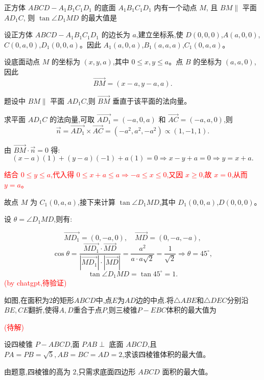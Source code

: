 \begin{questions}
    
    \question 正方体 $ABCD-A_1B_1C_1D_1$ 的底面 $A_1B_1C_1D_1$ 内有一个动点 $M$, 且 $BM \parallel$ 平面 $AD_1C$, 则 $\tan \angle D_1MD$ 的最大值是
    \begin{solution}
设正方体 $ABCD - A_1B_1C_1D_1$ 的边长为 $a$,建立坐标系,使 $D(0,0,0)$,$A(a,0,0)$,$C(0,a,0)$,$D_1(0,0,a)$。因此 $A_1(a,0,a)$,$B_1(a,a,a)$,$C_1(0,a,a)$。

设底面动点 $M$ 的坐标为 $(x,y,a)$,其中 $0 \le x,y \le a$。点 $B$ 的坐标为 $(a,a,0)$,因此
\[
\vec{BM} = (x - a, y - a, a).
\]

题设中 $BM \parallel$ 平面 $AD_1C$,则 $\vec{BM}$ 垂直于该平面的法向量。

求平面 $AD_1C$ 的法向量,可取 $\vec{AD_1} = (-a, 0, a)$ 和 $\vec{AC} = (-a, a, 0)$,则
\[
\vec{n} = \vec{AD_1} \times \vec{AC} = (-a^2, a^2, -a^2) \propto (1, -1, 1).
\]

由 $\vec{BM} \cdot \vec{n} = 0$ 得:
\[
(x - a)(1) + (y - a)(-1) + a(1) = 0 \Rightarrow x - y + a = 0 \Rightarrow y = x + a.
\]

\textcolor{red}{结合 $0 \le y \le a$,代入得 $0 \le x + a \le a \Rightarrow -a \le x \le 0$,又因 $x \ge 0$,故 $x = 0$,从而 $y = a$。}

故点 $M$ 为 $C_1(0,a,a)$,接下来计算 $\tan \angle D_1MD$,其中 $D_1(0,0,a)$,$D(0,0,0)$。

设 $\theta = \angle D_1MD$,则有:

\[
\vec{MD_1} = (0, -a, 0), \quad \vec{MD} = (0, -a, -a),
\]
\[
\cos \theta = \frac{\vec{MD_1} \cdot \vec{MD}}{|\vec{MD_1}| \cdot |\vec{MD}|} = \frac{a^2}{a \cdot a\sqrt{2}} = \frac{1}{\sqrt{2}} \Rightarrow \theta = 45^\circ,
\]
\[
\tan \angle D_1MD = \tan 45^\circ = \boxed{1}.
\]
\textcolor{red}{(by chatgpt,待验证)}

\end{solution}
    \question 如图,在面积为2的矩形$ABCD$中,点$E$为$AD$边的中点.将$\triangle ABE$和$\triangle DEC$分别沿$BE,CE$翻折,使得$A,D$重合于点$P$,则三棱锥$P-EBC$体积的最大值为
    \begin{solution}
        \textcolor{red}{(待解)}
    \end{solution}
    
    \question 设四棱锥 $P-ABCD$,面 $PAB \perp$ 底面 $ABCD$,且 $PA=PB=\sqrt{5},AB=BC=AD=2$,求该四棱锥体积的最大值。
        
    \begin{solution}
        由题意,四棱锥的高为 $2$,只需求底面四边形 $ABCD$ 面积的最大值。
        

\end{solution}
\end{questions}
